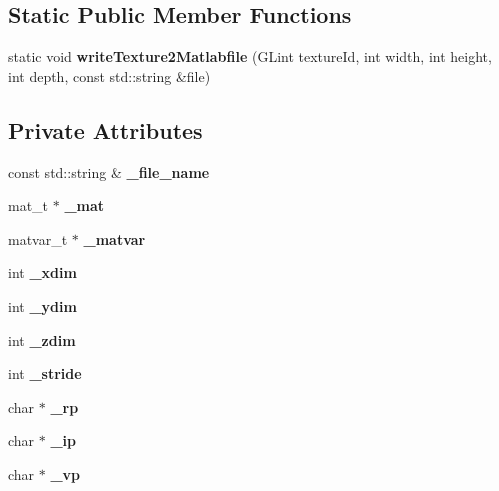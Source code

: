 \subsection*{Static Public Member Functions}
\begin{DoxyCompactItemize}
\item 
static void {\bfseries write\-Texture2\-Matlabfile} (G\-Lint texture\-Id, int width, int height, int depth, const std\-::string \&file)\label{classsfs__visualizer_1_1MatlabFileAdapter_af734ded74ae130d9f977046056e27a27}

\end{DoxyCompactItemize}
\subsection*{Private Attributes}
\begin{DoxyCompactItemize}
\item 
const std\-::string \& {\bfseries \-\_\-file\-\_\-name}\label{classsfs__visualizer_1_1MatlabFileAdapter_af4566c4a17dd64fc1462883de4b5f35b}

\item 
mat\-\_\-t $\ast$ {\bfseries \-\_\-mat}\label{classsfs__visualizer_1_1MatlabFileAdapter_a85f895d36b743214832393ceaefd1261}

\item 
matvar\-\_\-t $\ast$ {\bfseries \-\_\-matvar}\label{classsfs__visualizer_1_1MatlabFileAdapter_a69342d92fa7ac756a1aa91bd6564c44a}

\item 
int {\bfseries \-\_\-xdim}\label{classsfs__visualizer_1_1MatlabFileAdapter_a0fb4d69aae12ae3b7a0c0781ab726805}

\item 
int {\bfseries \-\_\-ydim}\label{classsfs__visualizer_1_1MatlabFileAdapter_a63aa2a3584fd8cfad3982bad0b1a6c2c}

\item 
int {\bfseries \-\_\-zdim}\label{classsfs__visualizer_1_1MatlabFileAdapter_a5900871096b21dd6acbd067b15cc244d}

\item 
int {\bfseries \-\_\-stride}\label{classsfs__visualizer_1_1MatlabFileAdapter_a55123110e24559d37b0d79a4cfac8bc4}

\item 
char $\ast$ {\bfseries \-\_\-rp}\label{classsfs__visualizer_1_1MatlabFileAdapter_a6e399cb8ea2d5a74a9ac127a8d3b8b7a}

\item 
char $\ast$ {\bfseries \-\_\-ip}\label{classsfs__visualizer_1_1MatlabFileAdapter_af40a587c27ea5679165857f429ea429a}

\item 
char $\ast$ {\bfseries \-\_\-vp}\label{classsfs__visualizer_1_1MatlabFileAdapter_ab67614dbc44570faea981cd44cb26620}

\end{DoxyCompactItemize}


